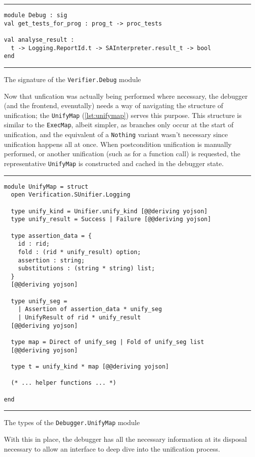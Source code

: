 \begin{listing}[!ht]
\noindent\rule{\textwidth}{0.5pt}
\vspace{-0.6cm}
\begin{verbatim}
module Debug : sig
val get_tests_for_prog : prog_t -> proc_tests

val analyse_result :
  t -> Logging.ReportId.t -> SAInterpreter.result_t -> bool
end
\end{verbatim}
\vspace{-0.4cm}
\noindent\rule{\textwidth}{0.5pt}
\vspace{-0.6cm}
\caption{The signature of the \texttt{Verifier.Debug} module}
\label{lst:verifier-debug}
\end{listing}

Now that unfication was actually being performed where necessary, the debugger
(and the frontend, evenutally) needs a way of navigating the structure of
unification; the \texttt{UnifyMap} (\autoref{lst:unifymap}) serves this purpose.
This structure is similar to the \texttt{ExecMap}, albeit simpler, as branches
only occur at the start of unification, and the equivalent of a \texttt{Nothing}
variant wasn't necessary since unification happens all at once. When
postcondition unification is manually performed, or another unification (such as
for a function call) is requested, the representative \texttt{UnifyMap} is
constructed and cached in the debugger state.

\begin{listing}[!ht]
\noindent\rule{\textwidth}{0.5pt}
\vspace{-0.6cm}
\begin{verbatim}
module UnifyMap = struct
  open Verification.SUnifier.Logging

  type unify_kind = Unifier.unify_kind [@@deriving yojson]
  type unify_result = Success | Failure [@@deriving yojson]

  type assertion_data = {
    id : rid;
    fold : (rid * unify_result) option;
    assertion : string;
    substitutions : (string * string) list;
  }
  [@@deriving yojson]

  type unify_seg =
    | Assertion of assertion_data * unify_seg
    | UnifyResult of rid * unify_result
  [@@deriving yojson]

  type map = Direct of unify_seg | Fold of unify_seg list
  [@@deriving yojson]

  type t = unify_kind * map [@@deriving yojson]

  (* ... helper functions ... *)

end
\end{verbatim}
\vspace{-0.4cm}
\noindent\rule{\textwidth}{0.5pt}
\vspace{-0.6cm}
\caption{The types of the \texttt{Debugger.UnifyMap} module}
\label{lst:unifymap}
\end{listing}

With this in place, the debugger has all the necessary information at its
disposal necessary to allow an interface to deep dive into the unification
process.
